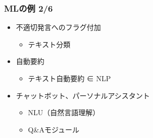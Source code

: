 \documentclass[aspectratio=169, dvipdfmx, 14pt, xcolor={svgnames,dvipsnames}]{beamer}
\def\tightlist{\itemsep1pt\parskip0pt\parsep0pt}
\begin{document}

\begin{frame}
  \frametitle{MLの例 2/6}
  \begin{itemize}
    \item
          不適切発言へのフラグ付加

          \begin{itemize}
            \tightlist
            \item
                  テキスト分類
          \end{itemize}
    \item
          自動要約

          \begin{itemize}
            \tightlist
            \item
                  テキスト自動要約 ∈ NLP
          \end{itemize}
    \item
          チャットボット、パーソナルアシスタント

          \begin{itemize}
            \tightlist
            \item
                  NLU（自然言語理解）
            \item
                  Q\&Aモジュール
          \end{itemize}
  \end{itemize}
\end{frame}

\end{document}
